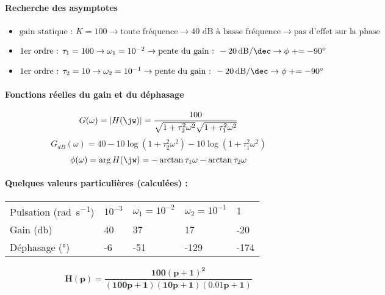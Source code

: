 \paragraph{Recherche des asymptotes}
\begin{itemize}
\item $\textrm{gain statique : } K=100      \rightarrow 
     \textrm{toute fréquence}           \rightarrow 
     \textrm{40 dB à basse fréquence}   \rightarrow 
     \textrm{pas d'effet sur la phase}$
\item $\textrm{1er ordre : }\tau_1=100     \rightarrow 
     \omega_1=10^{-2}                   \rightarrow 
     \textrm{pente du gain : } 
     \SI[per-mode=symbol]{-20}{\dB\per\dec}  \rightarrow 
     \phi\mathrel{+}=-90\si{\degree}$ 
\item $ \textrm{1er ordre : }\tau_2=10     \rightarrow 
     \omega_2=10^{-1}                   \rightarrow 
     \textrm{pente du gain : } 
     \SI[per-mode=symbol]{-20}{\dB\per\dec} \rightarrow 
     \phi\mathrel{+}=-90\si{\degree}$ 
\end{itemize}
\begin{center}
    

    
\end{center}
\paragraph{Fonctions réelles du gain et du déphasage}
\[
G(\omega)=|H(\jw)|=
\dfrac{100}{\sqrt{1+\tau_2^2\omega^2}\sqrt{1+\tau_1^2\omega^2}}
\]
\[
G_{dB}(\omega)=40-10\log{(1+\tau_2^2\omega^2)}-10\log{(1+\tau_1^2\omega^2)}
\]
\[
\phi(\omega)=\arg{H(\jw)}=-\arctan{\tau_1\omega}-\arctan{\tau_2\omega}
\]
\paragraph{Quelques valeurs particulières (calculées) :}
\begin{center}
\begin{tabular}{P{3.5cm}P{2cm}P{2cm}P{2cm}P{2cm}}
\hline
\hline
Pulsation (\si{\radian\per\second}) 
& $10^{-3}$ & $\omega_1=10^{-2}$ & $\omega_2=10^{-1}$ &     1  \\[1em]
Gain (\si{\decibel})       
&   40      &    37              &    17              &   -20  \\[1em]
Déphasage (\si{\degree})   
&  -6       &   -51              &  -129              &  -174  \\[1em]
\hline
\hline
\end{tabular}
\end{center}
\newpage
\question{}
\[
\boldsymbol{H(p) = \dfrac{100(p+1)^2}{(100p+1)(10p+1)(0.01p+1)}}
\]

